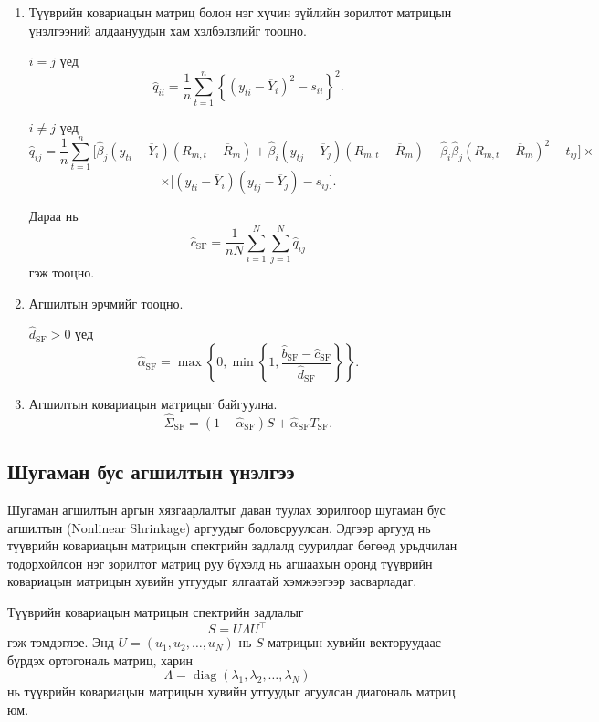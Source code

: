 \begin{enumerate}
	\item Түүврийн ковариацын матриц
	болон нэг хүчин зүйлийн зорилтот
	матрицын үнэлгээний алдаануудын
	хам хэлбэлзлийг тооцно.
	
	$i=j$ үед
	\[
	\widehat q_{ii}
	=
	\frac{1}{n}
	\sum_{t=1}^{n}
	\left\{
	(y_{ti}-\overline{Y}_i)^2-s_{ii}
	\right\}^{2}.
	\]
	
	$i\neq j$ үед
	\[
	\widehat q_{ij}
	=
	\frac{1}{n}
	\sum_{t=1}^{n}
	\Big[
	\widehat{\beta}_j
	(y_{ti}-\overline{Y}_i)
	(R_{m,t}-\overline{R}_m)
	+
	\widehat{\beta}_i
	(y_{tj}-\overline{Y}_j)
	(R_{m,t}-\overline{R}_m)
	-
	\widehat{\beta}_i\widehat{\beta}_j
	(R_{m,t}-\overline{R}_m)^2
	-t_{ij}
	\Big]\times
	\]
	\[\times
	\Big[
	(y_{ti}-\overline{Y}_i)
	(y_{tj}-\overline{Y}_j)-s_{ij}
	\Big].
	\]
	
	Дараа нь
	\[
	\widehat c_{\mathrm{SF}}
	=
	\frac{1}{nN}
	\sum_{i=1}^{N}
	\sum_{j=1}^{N}
	\widehat q_{ij}
	\]
	гэж тооцно.
	
	\item Агшилтын эрчмийг тооцно.
	
	$\widehat d_{\mathrm{SF}}>0$ үед
	\[
	\widehat{\alpha}_{\mathrm{SF}}
	=
	\max
	\left\{
	0,
	\min
	\left\{
	1,
	\frac{
		\widehat b_{\mathrm{SF}}
		-
		\widehat c_{\mathrm{SF}}
	}{
		\widehat d_{\mathrm{SF}}
	}
	\right\}
	\right\}.
	\]
	
	\item Агшилтын ковариацын
	матрицыг байгуулна.
	\[
	\widehat{\Sigma}_{\mathrm{SF}}
	=
	(1-\widehat{\alpha}_{\mathrm{SF}})S
	+
	\widehat{\alpha}_{\mathrm{SF}}T_{\mathrm{SF}}.
	\]
	
\end{enumerate}

\subsection{Шугаман бус агшилтын үнэлгээ}

Шугаман агшилтын аргын хязгаарлалтыг даван туулах зорилгоор шугаман бус агшилтын (Nonlinear Shrinkage) аргуудыг боловсруулсан. Эдгээр аргууд нь түүврийн ковариацын матрицын спектрийн задлалд суурилдаг бөгөөд урьдчилан тодорхойлсон нэг зорилтот матриц руу бүхэлд нь агшаахын оронд түүврийн ковариацын матрицын хувийн утгуудыг ялгаатай хэмжээгээр засварладаг.

Түүврийн ковариацын матрицын спектрийн задлалыг
\[
S
=
U\Lambda U^{\top}
\]
гэж тэмдэглэе. Энд $U=(u_1,u_2,\ldots,u_N)$ нь $S$ матрицын хувийн векторуудаас бүрдэх ортогональ матриц, харин
\[
\Lambda
=
\operatorname{diag}
(\lambda_1,\lambda_2,\ldots,\lambda_N)
\]
нь түүврийн ковариацын матрицын хувийн утгуудыг агуулсан диагональ матриц юм.

